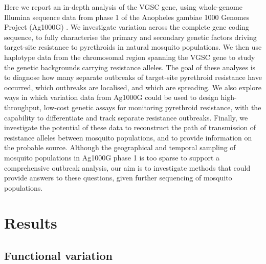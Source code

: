 \documentclass[a4paper,11pt,abstracton,hidelinks]{scrartcl}
\begin{document}
Here we report an in-depth analysis of the VGSC gene, using whole-genome Illumina sequence data from phase 1 of the Anopheles gambiae 1000 Genomes Project (Ag1000G) \cite{Ag1000gConsortium2017}.
%
We investigate variation across the complete gene coding sequence, to fully characterise the primary and secondary genetic factors driving target-site resistance to pyrethroids in natural mosquito populations.
%
We then use haplotype data from the chromosomal region spanning the VGSC gene to study the genetic backgrounds carrying resistance alleles.
%
The goal of these analyses is to diagnose how many separate outbreaks of target-site pyrethroid resistance have occurred, which outbreaks are localised, and which are spreading.
%
We also explore ways in which variation data from Ag1000G could be used to design high-throughput, low-cost genetic assays for monitoring pyrethroid resistance, with the capability to differentiate and track separate resistance outbreaks.
%
Finally, we investigate the potential of these data to reconstruct the path of transmission of resistance alleles between mosquito populations, and to provide information on the probable source.
%
Although the geographical and temporal sampling of mosquito populations in Ag1000G phase 1 is too sparse to support a comprehensive outbreak analysis, our aim is to investigate methods that could provide answers to these questions, given further sequencing of mosquito populations.  




\section*{Results}


\subsection*{Functional variation}
\end{document}
